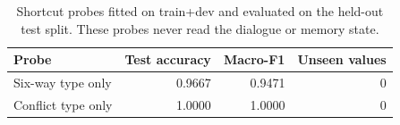 \begin{table}[t]
\centering
\small
\caption{Shortcut probes fitted on train+dev and evaluated on the held-out test
split. These probes never read the dialogue or memory state.}
\label{tab:shortcut}
\begin{tabular}{@{}lrrr@{}}
\toprule
Probe & Test accuracy & Macro-F1 & Unseen values \\
\midrule
Six-way type only & 0.9667 & 0.9471 & 0 \\
Conflict type only & 1.0000 & 1.0000 & 0 \\
\bottomrule
\end{tabular}
\end{table}
